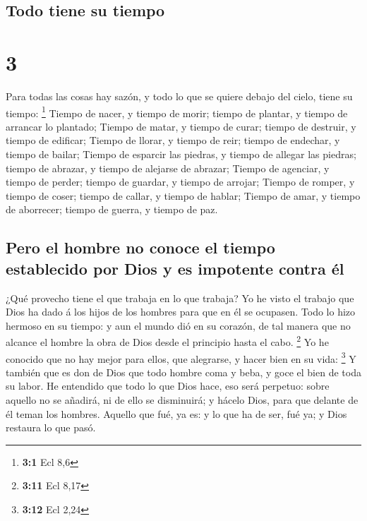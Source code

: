 \hypertarget{todo-tiene-su-tiempo}{%
\subsection{Todo tiene su tiempo}\label{todo-tiene-su-tiempo}}

\hypertarget{section-2}{%
\section{3}\label{section-2}}

 Para todas las cosas hay sazón, y todo lo que se quiere
debajo del cielo, tiene su tiempo: \footnote{\textbf{3:1} Ecl 8,6}
 Tiempo de nacer, y tiempo de morir; tiempo de plantar, y
tiempo de arrancar lo plantado;  Tiempo de matar, y tiempo
de curar; tiempo de destruir, y tiempo de edificar;  Tiempo
de llorar, y tiempo de reir; tiempo de endechar, y tiempo de bailar;
 Tiempo de esparcir las piedras, y tiempo de allegar las
piedras; tiempo de abrazar, y tiempo de alejarse de abrazar;
 Tiempo de agenciar, y tiempo de perder; tiempo de guardar,
y tiempo de arrojar;  Tiempo de romper, y tiempo de coser;
tiempo de callar, y tiempo de hablar;  Tiempo de amar, y
tiempo de aborrecer; tiempo de guerra, y tiempo de paz.

\hypertarget{pero-el-hombre-no-conoce-el-tiempo-establecido-por-dios-y-es-impotente-contra-uxe9l}{%
\subsection{Pero el hombre no conoce el tiempo establecido por Dios y es
impotente contra
él}\label{pero-el-hombre-no-conoce-el-tiempo-establecido-por-dios-y-es-impotente-contra-uxe9l}}

 ¿Qué provecho tiene el que trabaja en lo que trabaja?
 Yo he visto el trabajo que Dios ha dado á los hijos de los
hombres para que en él se ocupasen.  Todo lo hizo hermoso
en su tiempo: y aun el mundo dió en su corazón, de tal manera que no
alcance el hombre la obra de Dios desde el principio hasta el cabo.
\footnote{\textbf{3:11} Ecl 8,17}  Yo he conocido que no
hay mejor para ellos, que alegrarse, y hacer bien en su vida:
\footnote{\textbf{3:12} Ecl 2,24}  Y también que es don de
Dios que todo hombre coma y beba, y goce el bien de toda su labor.
 He entendido que todo lo que Dios hace, eso será perpetuo:
sobre aquello no se añadirá, ni de ello se disminuirá; y hácelo Dios,
para que delante de él teman los hombres.  Aquello que fué,
ya es: y lo que ha de ser, fué ya; y Dios restaura lo que pasó.

